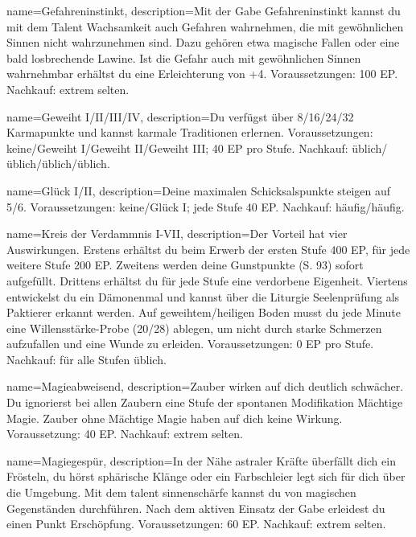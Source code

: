 {
    name={Gefahreninstinkt},
    description={Mit der Gabe Gefahreninstinkt kannst du mit dem Talent Wachsamkeit auch Gefahren wahrnehmen, die mit gewöhnlichen Sinnen nicht wahrzunehmen sind. Dazu gehören etwa magische Fallen oder eine bald losbrechende Lawine. Ist die Gefahr auch mit gewöhnlichen Sinnen wahrnehmbar erhältst du eine Erleichterung von +4. Voraussetzungen: 100 EP. Nachkauf: extrem selten.}}

{
    name={Geweiht I/II/III/IV},
    description={Du verfügst über 8/16/24/32 Karmapunkte und kannst karmale Traditionen erlernen. Voraussetzungen: keine/Geweiht I/Geweiht II/Geweiht III; 40 EP pro Stufe. Nachkauf: üblich/üblich/üblich/üblich.}}

{
    name={Glück I/II},
    description={Deine maximalen Schicksalspunkte steigen auf 5/6. Voraussetzungen: keine/Glück I; jede Stufe 40 EP. Nachkauf: häufig/häufig.}}

{
    name={Kreis der Verdammnis I-VII},
    description={Der Vorteil hat vier Auswirkungen. Erstens erhältst du beim Erwerb der ersten Stufe 400 EP, für jede weitere Stufe 200 EP. Zweitens werden deine Gunstpunkte (S. 93) sofort aufgefüllt. Drittens erhältst du für jede Stufe eine verdorbene Eigenheit. Viertens entwickelst du ein Dämonenmal und kannst über die Liturgie Seelenprüfung als Paktierer erkannt werden. Auf geweihtem/heiligen Boden musst du jede Minute eine Willensstärke-Probe (20/28) ablegen, um nicht durch starke Schmerzen aufzufallen und eine Wunde zu erleiden. Voraussetzungen: 0 EP pro Stufe. Nachkauf: für alle Stufen üblich.}}

{
    name={Magieabweisend},
    description={Zauber wirken auf dich deutlich schwächer. Du ignorierst bei allen Zaubern eine Stufe der spontanen Modifikation Mächtige Magie. Zauber ohne Mächtige Magie haben auf dich keine Wirkung. Voraussetzung: 40 EP. Nachkauf: extrem selten.}}

{
    name={Magiegespür},
    description={In der Nähe astraler Kräfte überfällt dich ein Frösteln, du hörst sphärische Klänge oder ein Farbschleier legt sich für dich über die Umgebung. Mit dem \gls{talent} \gls{sinnenschärfe} kannst du  von magischen Gegenständen durchführen. Nach dem aktiven Einsatz der Gabe erleidest du einen Punkt Erschöpfung. Voraussetzungen: 60 EP. Nachkauf: extrem selten.}}

